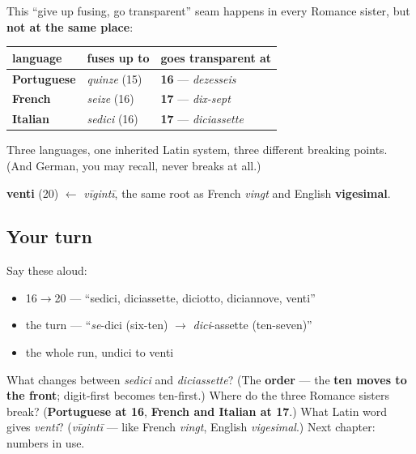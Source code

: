 \begin{grammarlens}[title={What you've built: three different breaks}]
This \textquotedblleft{}give up fusing, go transparent\textquotedblright{} seam happens in every Romance sister, but \textbf{not at the same place}:

\noindent
\begin{tabularx}{\linewidth}{@{}>{\raggedright\arraybackslash}X>{\raggedright\arraybackslash}X>{\raggedright\arraybackslash}X@{}}
\toprule
\textbf{language} & \textbf{fuses up to} & \textbf{goes transparent at} \\
\midrule
\textbf{Portuguese} & \emph{quinze} (15) & \textbf{16} — \emph{dezesseis} \\
\textbf{French} & \emph{seize} (16) & \textbf{17} — \emph{dix-sept} \\
\textbf{Italian} & \emph{sedici} (16) & \textbf{17} — \emph{diciassette} \\
\bottomrule
\end{tabularx}

Three languages, one inherited Latin system, three different breaking points. (And German, you may recall, never breaks at all.)

\textbf{venti} (20) $\leftarrow$ \emph{vīgintī}, the same root as French \emph{vingt} and English \textbf{vigesimal}.
\end{grammarlens}

\subsection*{Your turn}
Say these aloud:

\begin{itemize}
\raggedright
  \item 16$\to$20 — \textquotedblleft{}sedici, diciassette, diciotto, diciannove, venti\textquotedblright{}
  \item the turn — \textquotedblleft{}\emph{se}-dici (six-ten) $\to$ \emph{dici}-assette (ten-seven)\textquotedblright{}
  \item the whole run, undici to venti
\end{itemize}

\begin{tcolorbox}[breakable,colback=teal!4,colframe=teal!35!black,title={Before you move on}]
What changes between \emph{sedici} and \emph{diciassette}? (The \textbf{order} — the \textbf{ten moves to the front}; digit-first becomes ten-first.) Where do the three Romance sisters break? (\textbf{Portuguese at 16}, \textbf{French and Italian at 17}.) What Latin word gives \emph{venti}? (\emph{vīgintī} — like French \emph{vingt}, English \emph{vigesimal}.) Next chapter: numbers in use.
\end{tcolorbox}
